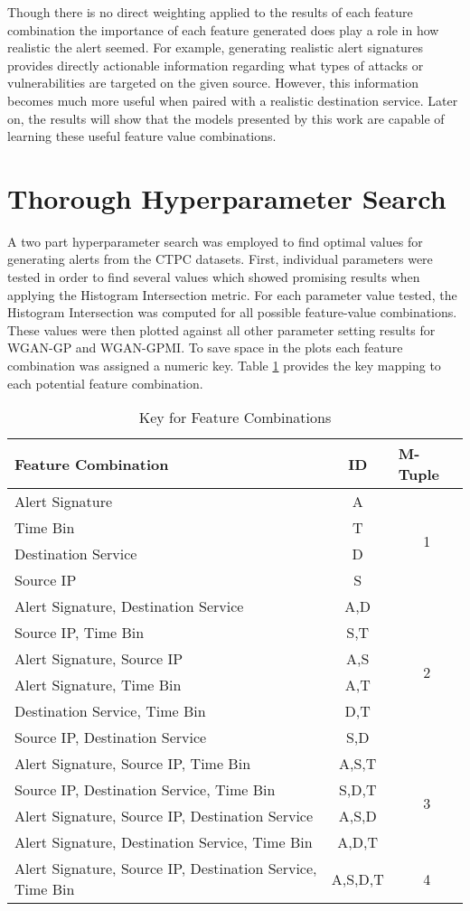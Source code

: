 Though there is no direct weighting applied to the results of each feature combination the importance of each feature generated does play a role in how realistic the alert seemed. For example, generating realistic alert signatures provides directly actionable information regarding what types of attacks or vulnerabilities are targeted on the given source. However, this information becomes much more useful when paired with a realistic destination service. Later on, the results will show that the models presented by this work are capable of learning these useful feature value combinations.

\section{Thorough Hyperparameter Search}
\label{sec:search}
A two part hyperparameter search was employed to find optimal values for generating alerts from the CTPC datasets. First, individual parameters were tested in order to find several values which showed promising results when applying the Histogram Intersection metric. For each parameter value tested, the Histogram Intersection was computed for all possible feature-value combinations. These values were then plotted against all other parameter setting results for WGAN-GP and WGAN-GPMI. To save space in the plots each feature combination was assigned a numeric key. Table \ref{tab:key} provides the key mapping to each potential feature combination.

\begin{table}[!htbp]
	\caption{Key for Feature Combinations}
	\label{tab:key}
	\centering
	\begin{tabular}{l|c|c}
		\textbf{Feature Combination} & \textbf{ID} & \multicolumn{1}{l}{\textbf{M-Tuple}} \\ \hline
		Alert Signature & A & \multirow{4}{*}{1} \\
		Time Bin & T &  \\
		Destination Service & D &  \\
		Source IP & S &  \\ \hline
		Alert Signature, Destination Service & A,D & \multirow{6}{*}{2} \\
		Source IP, Time Bin & S,T &  \\
		Alert Signature, Source IP & A,S &  \\
		Alert Signature, Time Bin & A,T &  \\
		Destination Service, Time Bin & D,T &  \\
		Source IP, Destination Service & S,D &  \\ \hline
		Alert Signature, Source IP, Time Bin & A,S,T & \multirow{4}{*}{3} \\
		Source IP, Destination Service, Time Bin & S,D,T &  \\
		Alert Signature, Source IP, Destination Service & A,S,D &  \\
		Alert Signature, Destination Service, Time Bin & A,D,T &  \\ \hline
		Alert Signature, Source IP, Destination Service, Time Bin & A,S,D,T & 4
	\end{tabular}
\end{table}

